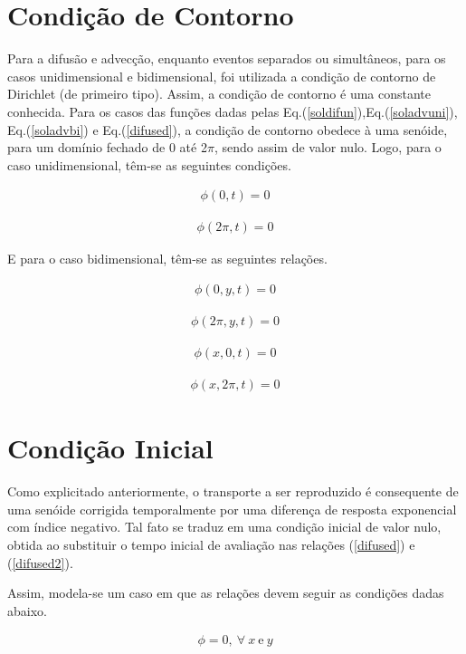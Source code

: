 \newpage

\section{Condição de Contorno}
\noindent

	Para a difusão e advecção, enquanto eventos separados ou simultâneos, para os casos unidimensional e bidimensional, foi utilizada a condição de contorno de Dirichlet (de primeiro tipo). Assim, a condição de contorno é uma constante conhecida. Para os casos das funções dadas pelas Eq.(\ref{soldifun}),Eq.(\ref{soladvuni}), Eq.(\ref{soladvbi}) e Eq.(\ref{difused}), a condição de contorno obedece à uma senóide, para um domínio fechado de 0 até 2$\pi$, sendo assim de valor nulo.
	Logo, para o caso unidimensional, têm-se as seguintes condições.
	
\begin{align}
\label{eqone}
\phi(0,t) = 0 
\end{align}

\begin{align}
\label{eqtwo}
\phi(2\pi,t) = 0 
\end{align}

	E para o caso bidimensional, têm-se as seguintes relações.
	
\begin{align}
\label{eqthree}
\phi(0,y,t) = 0 
\end{align}

\begin{align}
\label{eqfour}
\phi(2\pi,y,t) = 0
\end{align}

\begin{align}
\label{eqfive}
\phi(x,0,t) = 0
\end{align}

\begin{align}
\label{eqsix}
\phi(x,2\pi,t) = 0
\end{align}
	
\section{Condição Inicial}
\noindent

	Como explicitado anteriormente, o transporte a ser reproduzido é consequente de uma senóide corrigida temporalmente por uma diferença de resposta exponencial com índice negativo. Tal fato se traduz em uma condição inicial de valor nulo, obtida ao substituir o tempo inicial de avaliação nas relações (\ref{difused}) e (\ref{difused2}).
	
	Assim, modela-se um caso em que as relações devem seguir as condições dadas abaixo.

\begin{align}
\label{eqth}
\phi = 0 , \ \forall \ x \ \text{e} \ y 
\end{align}

